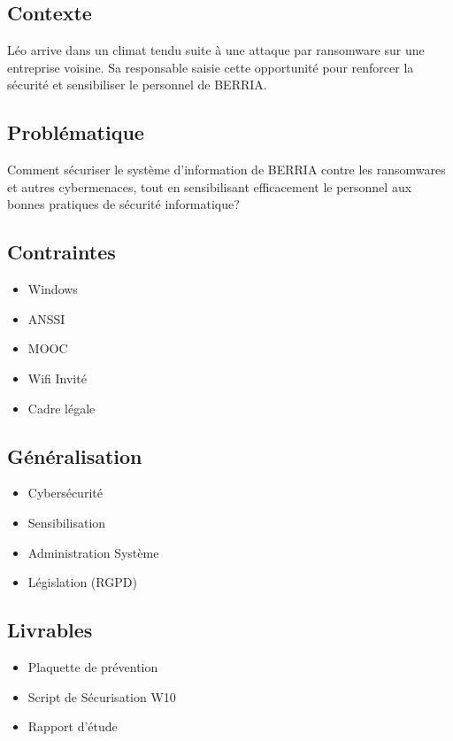 \subsection*{Contexte}
{}
Léo arrive dans un climat tendu suite à une attaque par ransomware sur une entreprise voisine. Sa responsable saisie cette opportunité pour renforcer la sécurité et sensibiliser le personnel de BERRIA.

\subsection*{Problématique}
{}
Comment sécuriser le système d'information de BERRIA contre les ransomwares et autres cybermenaces, tout en sensibilisant efficacement le personnel aux bonnes pratiques de sécurité informatique?

\subsection*{Contraintes}
{}
\begin{itemize}
  \item Windows
  \item ANSSI
  \item MOOC
  \item Wifi Invité
  \item Cadre légale
\end{itemize}

\subsection*{Généralisation}
{}
\begin{itemize}
  \item Cybersécurité
  \item Sensibilisation
  \item Administration Système
  \item Législation (RGPD)
\end{itemize}

\subsection*{Livrables}
{}
\begin{itemize}
  \item Plaquette de prévention
  \item Script de Sécurisation W10
  \item Rapport d'étude
\end{itemize}

